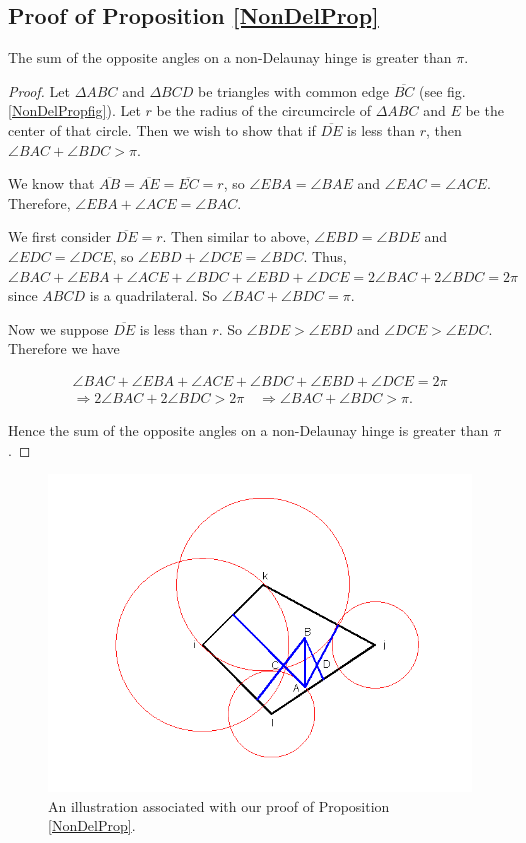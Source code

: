 \documentclass[12pt]{article}
\begin{document}
\subsection{Proof of Proposition \ref{NonDelProp}}
The sum of the opposite angles on a non-Delaunay hinge is greater than $\pi$.
\begin{proof}
\label{prop1}
Let $\Delta ABC$ and $\Delta BCD$ be triangles with common edge $\overline{BC}$ (see fig. \ref{NonDelPropfig}). Let $r$ be the radius of the circumcircle of  $\Delta ABC$ and $E$ be the center of that circle. Then we wish to show that if $\overline{DE}$ is less than $r$, then $\angle BAC + \angle BDC > \pi$.

We know that $\overline{AB}=\overline{AE}=\overline{EC}=r$, so $\angle EBA = \angle BAE$ and $\angle EAC = \angle ACE$. Therefore, $\angle EBA + \angle ACE= \angle BAC$.

We first consider $\overline{DE}=r$. Then similar to above, $\angle EBD = \angle BDE$ and $\angle EDC = \angle DCE$, so $\angle EBD + \angle DCE= \angle BDC$. Thus, $\angle BAC + \angle EBA + \angle ACE + \angle BDC + \angle EBD + \angle DCE = 2\angle BAC + 2\angle BDC = 2\pi$
since $ABCD$ is a quadrilateral. So $\angle BAC + \angle BDC = \pi$.

Now we suppose $\overline{DE}$ is less than $r$. So $\angle BDE > \angle EBD$ and $\angle DCE > \angle EDC$. Therefore we have

\begin{align*}
\angle BAC + \angle EBA + \angle ACE + \angle BDC + \angle EBD + \angle DCE = 2\pi \\
\Rightarrow 2\angle BAC + 2\angle BDC > 2\pi \quad \Rightarrow \angle BAC + \angle BDC > \pi.
\end{align*}

 Hence the sum of the opposite angles on a non-Delaunay hinge is greater than $\pi$. \qedhere
\end{proof}

\begin{figure}
\label{weidelpropfig}
\centering
\includegraphics[scale = 0.45]{Pictures3/geometryW2.png}
\caption{An illustration associated with our proof of Proposition \ref{NonDelProp}.}
\end{figure}
\end{document}
